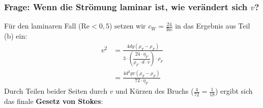 \documentclass[a4paper,11pt]{article}
\begin{document}
\subsubsection*{Frage: Wenn die Strömung laminar ist, wie verändert sich $v$?}
Für den laminaren Fall ($\text{Re} < 0{,}5$) setzen wir $c_W = \frac{24}{\text{Re}}$ in das Ergebnis aus Teil (b) ein:
\begin{align*}
    v^2 &= \frac{4 d g (\rho_T - \rho_F)}{3 \cdot \left(\dfrac{24 \cdot \eta_F}{\rho_F \cdot d \cdot v}\right) \cdot \rho_F} \\
    &= \frac{4 d^2 g v (\rho_T - \rho_F)}{72 \cdot \eta_F}
\end{align*}
\ppbig
Durch Teilen beider Seiten durch $v$ und Kürzen des Bruchs ($\frac{4}{72} = \frac{1}{18}$) ergibt sich das finale \textbf{Gesetz von Stokes}:
\end{document}
